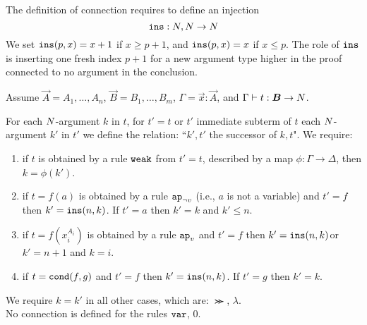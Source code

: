%
%


The definition of connection requires to define an injection 
\[
{\tt ins}:{N},{N} \rightarrow{N}
\]
We set ${\tt ins}(p,x)=x+1$ if $x \ge p+1$, and ${\tt ins}(p,x)=x$ if $x\le p$.
The role of ${\tt ins}$ is inserting one fresh index $p+1$ for a new argument type higher in the proof
connected to no argument in the conclusion.

\begin{definition}
Assume $\vec{A} = A_1, \ldots, A_n$, $\vec{B}=B_1, \ldots, B_m$, $\Gamma = \vec{x}:\vec{A}$,
and $\Gamma \vdash t:\vec{B} \rightarrow \N$.

For each ${N}$-argument $k$ in $t$, for $t'=t$ or $t'$  immediate subterm of $t$ 
each ${N}$-argument $k'$ in $t'$ we define the relation: ``$k',t'$ the successor of $k,t$". We require:
\begin{enumerate}
\item
if $t$ is obtained by a rule ${\tt weak}$ from $t'=t$, described by a map $\phi:\Gamma \rightarrow \Delta$,  
then $k = \phi(k')$.
\item
if $t=f(a)$ is obtained by a rule $\apnotvar$ (i.e., $a$ is not a variable) and $t'=f$ 
then $k' = {\tt ins}(n,k)$. If $t'=a$ then $k'=k$ and $k' \le n$.
\item
if $t=f(x_i^{A_i})$ is obtained by a rule $\apvar$ and $t'=f$ 
then $k' = {\tt ins}(n,k)$or $k'=n+1$ and $k=i$.
\item
if $t={\tt cond}(f,g)$ and $t'=f$ 
then $k' = {\tt ins}(n,k)$. If $t'=g$ then $k'=k$.
\end{enumerate}
We require $k = k'$ in all other cases, 
which are: $\Succ $, $\lambda$. 
\\
No connection is defined for the rules ${\tt var}$, $0$.
\end{definition}

